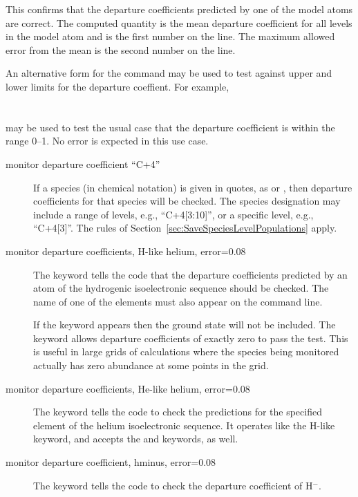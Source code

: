 This confirms that the departure coefficients predicted by one of the
model atoms are correct.
The computed quantity is the mean departure coefficient for all levels
in the model atom and is the first number on the line.
The maximum allowed error from the mean is the second number on the line.

An alternative form for the command may be used to test against upper
and lower limits for the departure coeffient.
For example,\\
%
\\
\\
%
\noindent
may be used to test the usual case that the departure coefficient
is within the range 0--1.
No error is expected in this use case.

\begin{description}

\item[monitor departure coefficient ``C+4'']
If a species (in chemical notation) is given in quotes,
as  or ,
then departure coefficients for that species will be checked.
The species designation may include a range of levels,
e.g., ``C+4[3:10]'', or a specific level, e.g., ``C+4[3]''.
The rules of Section~\ref{sec:SaveSpeciesLevelPopulations} apply.

\item[monitor departure coefficients, H-like helium, error=0.08]
The keyword
 tells the code that the departure coefficients predicted by an atom
of the hydrogenic isoelectronic sequence should be checked.  The name of
one of the elements must also appear on the command line.

If the keyword  appears then the ground state will not be included.
The keyword  allows departure coefficients of exactly zero to pass
the test.  This is useful in large grids of calculations where the species
being monitored actually has zero abundance at some points in the grid.

\item[monitor departure coefficients, He-like helium, error=0.08]
The keyword  tells the code to check the predictions
for the specified element of the helium isoelectronic sequence.
It operates like the H-like keyword, and accepts the 
and  keywords, as well.

\item[monitor departure coefficient, hminus, error=0.08]
The keyword  tells the code to check
the departure coefficient of H$^-$.
\end{description}

